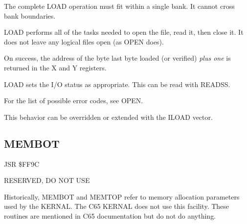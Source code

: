 \begin{description}[leftmargin=2cm,style=nextline]
        The complete LOAD operation must fit within a single bank. It cannot cross bank boundaries.

        LOAD performs all of the tasks needed to open the file, read it, then close it. It does not leave any logical files open (as OPEN does).

        On success, the address of the byte last byte loaded (or verified) \emph{plus one} is returned in the X and Y registers.

        LOAD sets the I/O status as appropriate. This can be read with READSS.

        For the list of possible error codes, see OPEN.

        This behavior can be overridden or extended with the ILOAD vector.
    \item [Example:]
\end{description}



\newpage
\subsection{MEMBOT}
\label{KERNAL Jump Table!MEMBOT}
\begin{description}[leftmargin=2cm,style=nextline]
    \item [Address:] JSR \$FF9C
    \item [Description:] RESERVED, DO NOT USE
    \item [Remarks:]
        Historically, MEMBOT and MEMTOP refer to memory allocation parameters used by the KERNAL. The C65 KERNAL does not use this facility. These routines are mentioned in C65 documentation but do not do anything.
\end{description}


